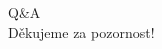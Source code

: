 \documentclass[aspectratio=1610]{beamer}
\begin{document}







\begin{frame}{}
    \centering
    \huge Q\&A\\
    Děkujeme za pozornost!
\end{frame}
\end{document}
